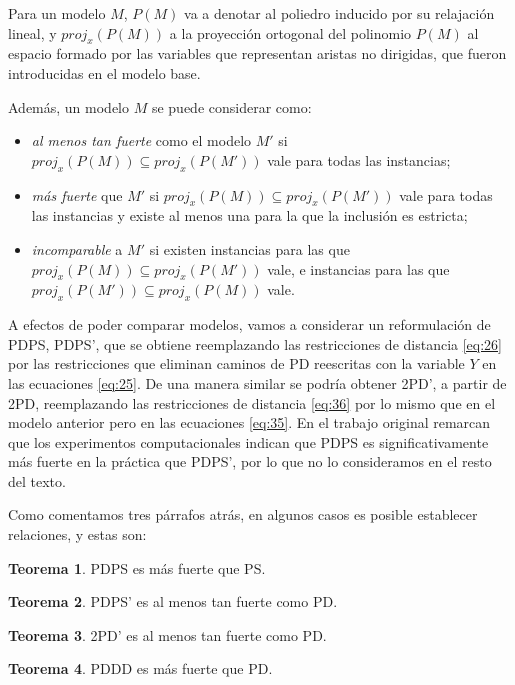 \documentclass[10pt, a4paper]{article}
\theoremstyle{definition}
\newtheorem{theorem}{Teorema}
\begin{document}
Para un modelo $M$, $P(M)$ va a denotar al poliedro inducido por su relajación lineal, y $proj_{x}(P(M))$ a la proyección ortogonal del polinomio $P(M)$ al espacio formado por las variables que representan aristas no dirigidas, que fueron introducidas en el modelo base.

Además, un modelo $M$ se puede considerar como:

\begin{itemize}
	\item \textit{al menos tan fuerte} como el modelo $M'$ si $proj_{x}(P(M)) \subseteq proj_{x}(P(M'))$ vale para todas las instancias;
	\item \textit{más fuerte} que $M'$ si $proj_{x}(P(M)) \subseteq proj_{x}(P(M'))$ vale para todas las instancias y existe al menos una para la que la inclusión es estricta;
	\item \textit{incomparable} a $M'$ si existen instancias para las que $proj_{x}(P(M)) \subseteq proj_{x}(P(M'))$ vale, e instancias para las que $proj_{x}(P(M')) \subseteq proj_{x}(P(M))$ vale.
\end{itemize}

A efectos de poder comparar modelos, vamos a considerar un reformulación de PDPS, PDPS', que se obtiene reemplazando las restricciones de distancia \ref{eq:26} por las restricciones que eliminan caminos de PD reescritas con la variable $Y$ en las ecuaciones \ref{eq:25}. De una manera similar se podría obtener 2PD', a partir de 2PD, reemplazando las restricciones de distancia \ref{eq:36} por lo mismo que en el modelo anterior pero en las ecuaciones \ref{eq:35}. En el trabajo original remarcan que los experimentos computacionales indican que PDPS es significativamente más fuerte en la práctica que PDPS', por lo que no lo consideramos en el resto del texto.

Como comentamos tres párrafos atrás, en algunos casos es posible establecer relaciones, y estas son:

\begin{theorem}
	PDPS es más fuerte que PS.
\end{theorem}

\begin{theorem}
	PDPS' es al menos tan fuerte como PD.
\end{theorem}

\begin{theorem}
	2PD' es al menos tan fuerte como PD.
\end{theorem}

\begin{theorem}
	PDDD es más fuerte que PD.
\end{theorem}
\end{document}
